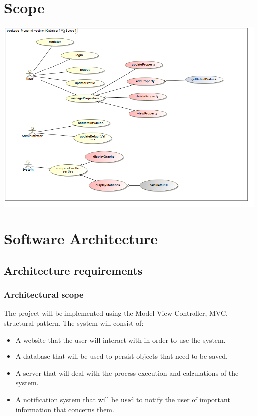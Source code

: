 \documentclass[a4paper,12pt]{article}
\begin{document}
\section{Scope}
\includegraphics[width=1\textwidth]{./Images/Scope.png}

\newpage
\section{Software Architecture}
\subsection{Architecture requirements}
\subsubsection{Architectural scope}
The project will be implemented using the Model View Controller, MVC, structural pattern.
The system will consist of:\begin{itemize}
	\item A website that the user will interact with in order to use the system.
	\item A database that will be used to persist objects that need to be saved.
	\item A server that will deal with the process execution and calculations of the system.
	\item A notification system that will be used to notify the user of important information that concerns them.
\end{itemize}
\end{document}
